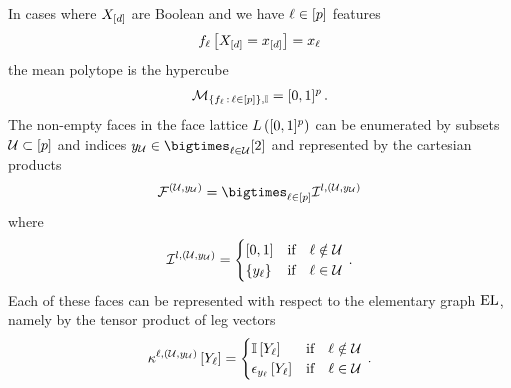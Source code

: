 \begin{example}[Hypercube]
    \label{exa:hypercubeFaces}
    In cases where $X_{[d]}$ are Boolean and we have $\ell\in[p]$ features
    \begin{align*}
        f_{\ell}\left[X_{[d]}=x_{[d]}\right] = x_{\ell}
    \end{align*}
    the mean polytope is the hypercube
    \begin{align*}
        \mathcal{M}_{\{f_{\ell}\,:\,\ell\in[p]\},\mathbb{I}} = [0,1]^{p} \, .
    \end{align*}
    The non-empty faces in the face lattice $L\left([0,1]^{p}\right)$ can be enumerated by subsets $\mathcal{U}\subset[p]$ and indices $\headindexof{\arbset}\in\bigtimes_{\selindex\in\arbset}[2]$ and represented by the cartesian products
    \begin{align*}
        \facesymbolof{(\arbset,\headindexof{\arbset})}
        = \bigtimes_{\selindexin} \mathcal{I}^{l,(\arbset,\headindexof{\arbset})}
    \end{align*}
    where
    \begin{align*}
        \mathcal{I}^{l,(\mathcal{U},y_{\mathcal{U}})}
        = \begin{cases}
        [0,1]
              & \text{if}\quad \ell\notin\mathcal{U} \\
              \{y_{\ell}\}& \text{if}\quad \ell\in\mathcal{U}
        \end{cases} \, .
    \end{align*}
    Each of these faces can be represented with respect to the elementary graph $\mathrm{EL}$, namely by the tensor product of leg vectors
    \begin{align*}
        \kappa^{\ell,(\mathcal{U},y_{\mathcal{U}})}\left[Y_{\ell}\right]
        = \begin{cases}
              \mathbb{I}\left[Y_{\ell}\right] & \text{if}\quad \ell\notin\mathcal{U} \\
              \epsilon_{y_{\ell}}\left[Y_{\ell}\right]& \text{if}\quad \ell\in\mathcal{U}
        \end{cases} \, .
    \end{align*}
\end{example}